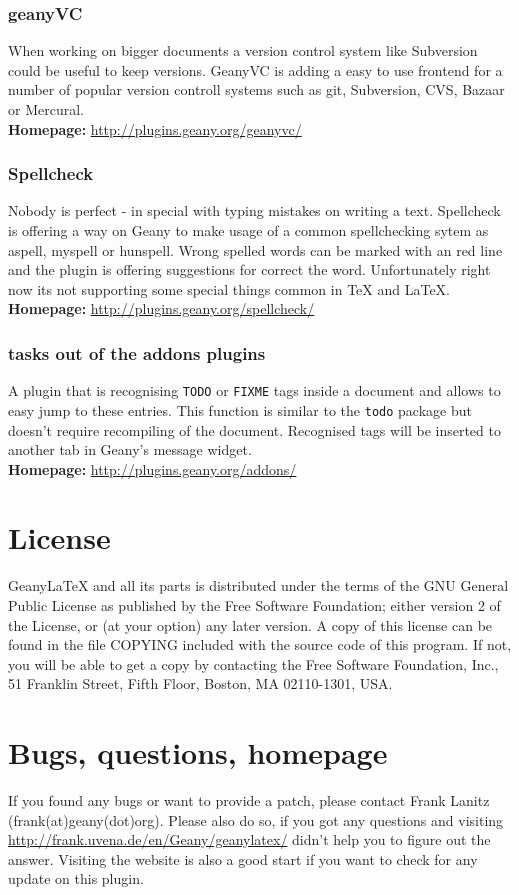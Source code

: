 \documentclass[%
paper=a4,%
fontsize=11pt,%
twoside=false,%
DIV18,
headsepline,
plainheadsepline,
footsepline,
plainfootsepline,
bibliography=totoc,%
listof=totoc,%
BCOR10mm,%
parskip=half,%
openany,%
]{scrartcl}
\begin{document}
\subsubsection{geanyVC}
When working on bigger documents a version control system like
Subversion could be useful to keep versions. GeanyVC is adding a easy
to use frontend for a number of popular version controll systems such
as git, Subversion, CVS, Bazaar or Mercural.\\
\textbf{Homepage:} \url{http://plugins.geany.org/geanyvc/}

\subsubsection{Spellcheck}
Nobody is perfect - in special with typing mistakes on writing a
text. Spellcheck is offering a way on Geany to make usage of a
common spellchecking sytem as aspell, myspell or hunspell. Wrong
spelled words can be marked with an red line and the plugin is
offering suggestions for correct the word. Unfortunately right now
its not supporting some special things common in \TeX{} and \LaTeX{}.\\
\textbf{Homepage:} \url{http://plugins.geany.org/spellcheck/}

\subsubsection{tasks out of the addons plugins}
A plugin that is recognising \texttt{TODO} or \texttt{FIXME} tags
inside a document and allows to easy jump to these entries. This
function is similar to the \texttt{todo} package but doesn't require
recompiling of the document. Recognised tags will be inserted to
another tab in Geany's message widget.\\
\textbf{Homepage:} \url{http://plugins.geany.org/addons/}

\section{License}
Geany\LaTeX{} and all its parts is distributed under the terms of the
GNU General Public License as published by the Free Software
Foundation; either version 2 of the License, or (at your option) any
later version. A copy of this license can be found in the file COPYING
included with the source code of this program. If not, you will be
able to get a copy by contacting the Free Software Foundation, Inc.,
51 Franklin Street, Fifth Floor, Boston, MA 02110-1301, USA.


\section{Bugs, questions, homepage}
\label{contact}
If you found any bugs or want to provide a patch, please contact Frank
Lanitz (frank(at)geany(dot)org). Please also do so, if you got any
questions and visiting \\ \url{http://frank.uvena.de/en/Geany/geanylatex/}
didn't help you to figure out the answer. Visiting the website is also
a good start if you want to check for any update on this plugin.
\end{document}
